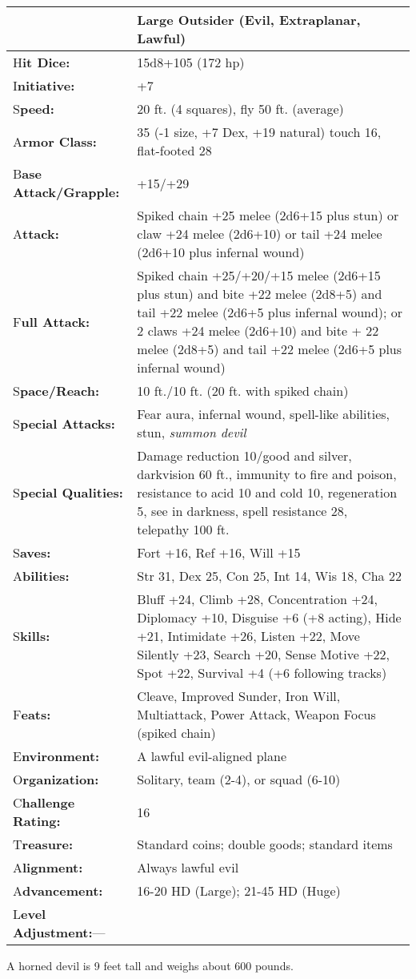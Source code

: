 \documentclass{article}
\begin{document}
\begin{tabular}{|>{\raggedright}p{91pt}|>{\raggedright}p{231pt}|}
\hline
  & Large Outsider (Evil, Extraplanar, Lawful)\tabularnewline
\hline
H\textbf{it Dice:} & 15d8+105 (172 hp)\tabularnewline
\hline
I\textbf{nitiative:} & +7\tabularnewline
\hline
S\textbf{peed:} & 20 ft. (4 squares), fly 50 ft. (average)\tabularnewline
\hline
A\textbf{rmor Class:} & 35 (-1 size, +7 Dex, +19 natural) touch 16, flat-footed 
28\tabularnewline
\hline
B\textbf{ase Attack/Grapple:} & +15/+29\tabularnewline
\hline
A\textbf{ttack:} & Spiked chain +25 melee (2d6+15 plus stun) or claw +24 melee 
(2d6+10) or tail +24 melee (2d6+10 plus infernal wound)\tabularnewline
\hline
F\textbf{ull Attack:} & Spiked chain +25/+20/+15 melee (2d6+15 plus stun) and bite 
+22 melee (2d8+5) and tail +22 melee (2d6+5 plus infernal wound); or 2 claws +24 
melee (2d6+10) and bite + 22 melee (2d8+5) and tail +22 melee (2d6+5 plus infernal 
wound)\tabularnewline
\hline
S\textbf{pace/Reach:} & 10 ft./10 ft. (20 ft. with spiked chain)\tabularnewline
\hline
S\textbf{pecial Attacks:} & Fear aura, infernal wound, spell-like abilities, stun, 
\textit{summon devil}\tabularnewline
\hline
S\textbf{pecial Qualities:} & Damage reduction 10/good and silver, darkvision 60 
ft., immunity to fire and poison, resistance to acid 10 and cold 10, regeneration 
5, see in darkness, spell resistance 28, telepathy 100 ft.\tabularnewline
\hline
S\textbf{aves:} & Fort +16, Ref +16, Will +15\tabularnewline
\hline
A\textbf{bilities:} & Str 31, Dex 25, Con 25, Int 14, Wis 18, Cha 22\tabularnewline
\hline
S\textbf{kills:} & Bluff +24, Climb +28, Concentration +24, Diplomacy +10, Disguise 
+6 (+8 acting), Hide +21, Intimidate +26, Listen +22, Move Silently +23, Search 
+20, Sense Motive +22, Spot +22, Survival +4 (+6 following tracks)\tabularnewline
\hline
F\textbf{eats:} & Cleave, Improved Sunder, Iron Will, Multiattack, Power Attack, 
Weapon Focus (spiked chain)\tabularnewline
\hline
E\textbf{nvironment:} & A lawful evil-aligned plane\tabularnewline
\hline
O\textbf{rganization:} & Solitary, team (2-4), or squad (6-10)\tabularnewline
\hline
C\textbf{hallenge Rating:} & 16\tabularnewline
\hline
T\textbf{reasure:} & Standard coins; double goods; standard items\tabularnewline
\hline
A\textbf{lignment:} & Always lawful evil\tabularnewline
\hline
A\textbf{dvancement:} & 16-20 HD (Large); 21-45 HD (Huge)\tabularnewline
\hline
L\textbf{evel Adjustment:}--- & \tabularnewline
\hline
\end{tabular}

A horned devil is 9 feet tall and weighs about 600 pounds.
\end{document}
